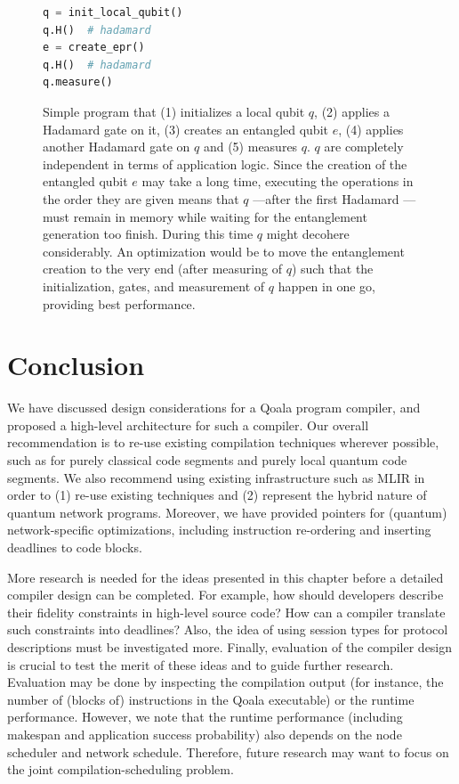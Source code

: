 \begin{figure}[t]
  \centering
  \begin{lstlisting}[language=Python]
q = init_local_qubit()
q.H()  # hadamard
e = create_epr()
q.H()  # hadamard
q.measure()
  \end{lstlisting}
  \caption{Simple program that (1) initializes a local qubit $q$, (2) applies a Hadamard gate on it, (3) creates an entangled qubit $e$, (4) applies another Hadamard gate on $q$ and (5) measures $q$.
  $q$ are completely independent in terms of application logic.
  Since the creation of the entangled qubit $e$ may take a long time, executing the operations in the order they are given means that $q$ ---after the first Hadamard --- must remain in memory while waiting for the entanglement generation too finish.
  During this time $q$ might decohere considerably.
  An optimization would be to move the entanglement creation to the very end (after measuring of $q$) such that the initialization, gates, and measurement of $q$ happen in one go, providing best performance.
  }
  \label{compiler:lst:reorder-network-ops}
\end{figure}



\section{Conclusion}
We have discussed design considerations for a Qoala program compiler, and proposed a high-level architecture for such a compiler.
Our overall recommendation is to re-use existing compilation techniques wherever possible, such as for purely classical code segments and purely local quantum code segments.
We also recommend using existing infrastructure such as MLIR in order to (1) re-use existing techniques and (2) represent the hybrid nature of quantum network programs.
Moreover, we have provided pointers for (quantum) network-specific optimizations, including instruction re-ordering and inserting deadlines to code blocks.

More research is needed for the ideas presented in this chapter before a detailed compiler design can be completed.
For example, how should developers describe their fidelity constraints in high-level source code?
How can a compiler translate such constraints into deadlines?
Also, the idea of using session types for protocol descriptions must be investigated more.
Finally, evaluation of the compiler design is crucial to test the merit of these ideas and to guide further research.
Evaluation may be done by inspecting the compilation output (for instance, the number of (blocks of) instructions in the Qoala executable) or the runtime performance.
However, we note that the runtime performance (including makespan and application success probability) also depends on the node scheduler and network schedule.
Therefore, future research may want to focus on the joint compilation-scheduling problem.
